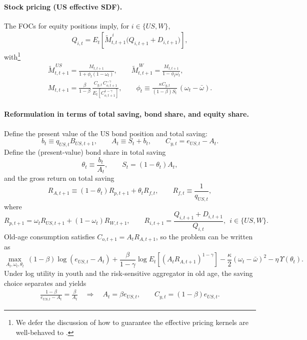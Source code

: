 \documentclass[12pt]{article}
\theoremstyle{plain}
\begin{document}
\paragraph{Stock pricing (US effective SDF).}
The FOCs for equity positions imply, for $i\in\{US,W\}$,
\begin{align}\label{US_AP_bond_cost}
Q_{i,t}
=
E_t\!\left[\tilde M^{\,i}_{t,t+1}\bigl(Q_{i,t+1}+D_{i,t+1}\bigr)\right],
\end{align}
with\footnote{We defer the discussion of how to guarantee the effective pricing kernels are well-behaved to
.}
\begin{align*}
\tilde M^{\,US}_{t,t+1}=\frac{M_{t,t+1}}{1+\phi_t(1-\omega_t)},
\qquad
\tilde M^{\,W}_{t,t+1}=\frac{M_{t,t+1}}{1-\phi_t\omega_t},\\
M_{t,t+1}
=\frac{\beta}{1-\beta}\,
\frac{C_{y,t}\,C_{o,t+1}^{-\gamma}}{E_t\!\left[C_{o,t+1}^{1-\gamma}\right]},
\qquad
\phi_t \equiv \frac{\kappa C_{y,t}}{(1-\beta)S_t}\,(\omega_t-\bar\omega).
\end{align*}

\paragraph{Reformulation in terms of total saving, bond share, and equity share.}
Define the present value of the US bond position and total saving:
\[
b_t\equiv q_{US,t}B_{US,t+1},
\qquad
A_t \equiv S_t+b_t,
\qquad
C_{y,t}=e_{US,t}-A_t.
\]
Define the (present-value) bond share in total saving
\[
\theta_t \equiv \frac{b_t}{A_t},
\qquad
S_t=(1-\theta_t)A_t,
\]
and the gross return on total saving
\[
R_{A,t+1}\equiv (1-\theta_t)R_{p,t+1}+\theta_t R_{f,t},
\qquad
R_{f,t}\equiv \frac{1}{q_{US,t}},
\]
where
\[
R_{p,t+1}=\omega_t R_{US,t+1}+(1-\omega_t)R_{W,t+1},
\qquad
R_{i,t+1}=\frac{Q_{i,t+1}+D_{i,t+1}}{Q_{i,t}},
\ \ i\in\{US,W\}.
\]
Old-age consumption satisfies $C_{o,t+1}=A_tR_{A,t+1}$, so the problem can be written as
\[
\max_{A_t,\omega_t,\theta_t}
\ (1-\beta)\log(e_{US,t}-A_t)
+\frac{\beta}{1-\gamma}\log E_t\!\left[(A_tR_{A,t+1})^{1-\gamma}\right]
-\frac{\kappa}{2}(\omega_t-\bar\omega)^2
-\eta\,\Upsilon(\theta_t).
\]
Under log utility in youth and the risk-sensitive aggregator in old age, the saving choice separates and yields
\begin{align}\label{US_saving_rule_bond_cost}
\frac{1-\beta}{e_{US,t}-A_t}=\frac{\beta}{A_t}
\quad\Rightarrow\quad
A_t=\beta e_{US,t},
\qquad
C_{y,t}=(1-\beta)e_{US,t}.
\end{align}
\end{document}
